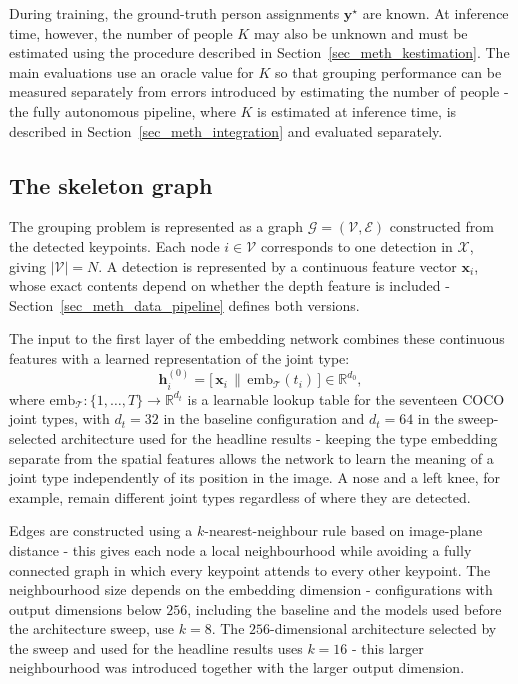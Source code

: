 During training, the ground-truth person assignments $\mathbf{y}^{\star}$ are known.
At inference time, however,
the number of people $K$ may also be unknown
and must be estimated using the procedure described in Section~\ref{sec_meth_kestimation}.
The main evaluations use an oracle value for $K$
so that grouping performance can be measured separately
from errors introduced by estimating the number of people -
the fully autonomous pipeline, where $K$ is estimated at inference time,
is described in Section~\ref{sec_meth_integration} and evaluated separately.

\subsection{The skeleton graph}
\label{sec_meth_problem_graph}

The grouping problem is represented as a graph $\mathcal{G} = (\mathcal{V}, \mathcal{E})$
constructed from the detected keypoints.
Each node $i \in \mathcal{V}$ corresponds to one detection in $\mathcal{X}$, giving $|\mathcal{V}| = N$.
A detection is represented by a continuous feature vector $\mathbf{x}_i$,
whose exact contents depend on whether the depth feature is included -
Section~\ref{sec_meth_data_pipeline} defines both versions.

The input to the first layer of the embedding network
combines these continuous features with a learned representation of the joint type:
\begin{equation}
    \mathbf{h}_i^{(0)}
    = \bigl[\,\mathbf{x}_i \,\big\|\,
    \mathrm{emb}_{\mathcal{T}}(t_i)\,\bigr]
    \in \mathbb{R}^{d_0},
    \label{eq:layer0_input}
\end{equation}
where $\mathrm{emb}_{\mathcal{T}} : \{1, \dots, T\} \to \mathbb{R}^{d_t}$
is a learnable lookup table for the seventeen COCO joint types,
with $d_t = 32$ in the baseline configuration
and $d_t = 64$ in the sweep-selected architecture used for the headline results -
keeping the type embedding separate from the spatial features
allows the network to learn the meaning of a joint type independently of its position in the image.
A nose and a left knee, for example,
remain different joint types regardless of where they are detected.

Edges are constructed using a $k$-nearest-neighbour rule based on image-plane distance -
this gives each node a local neighbourhood
while avoiding a fully connected graph in which every keypoint attends to every other keypoint.
The neighbourhood size depends on the embedding dimension -
configurations with output dimensions below $256$,
including the baseline and the models used before the architecture sweep,
use $k=8$.
The $256$-dimensional architecture selected by the sweep and used for the headline results uses $k=16$ -
this larger neighbourhood was introduced together with the larger output dimension.

